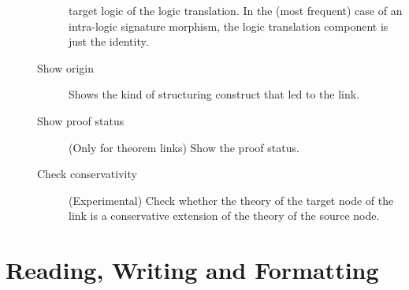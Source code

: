 \documentclass{article}
\begin{document}
\begin{description}
\begin{description}
target logic of the logic translation.
In the (most frequent) case
of an intra-logic signature morphism, the logic translation component is
just the identity.
\item[Show origin] Shows the kind of \CASL structuring construct that
led to the link.
\item[Show proof status] (Only for theorem links) Show the proof status.
\item[Check conservativity] (Experimental) Check whether the  
theory of the target node of the link
is a conservative extension of the theory of the source node.
\end{description}
\end{description}

\section{Reading, Writing and Formatting}
\end{document}
